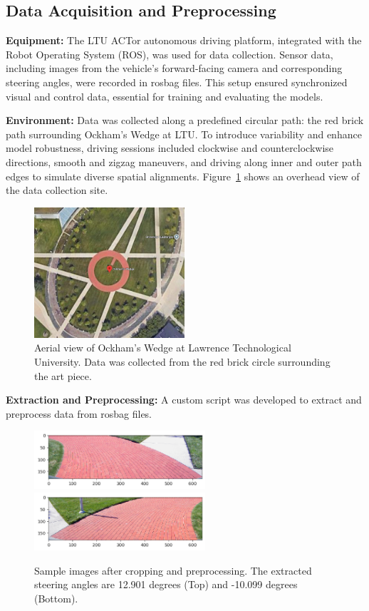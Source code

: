 \documentclass[conference]{IEEEtran}
\begin{document}
\subsection{Data Acquisition and Preprocessing}

\textbf{Equipment:} The LTU ACTor autonomous driving platform, integrated with the Robot Operating System (ROS), was used for data collection. Sensor data, including images from the vehicle's forward-facing camera and corresponding steering angles, were recorded in rosbag files. This setup ensured synchronized visual and control data, essential for training and evaluating the models.

\textbf{Environment:} Data was collected along a predefined circular path: the red brick path surrounding Ockham's Wedge at LTU. To introduce variability and enhance model robustness, driving sessions included clockwise and counterclockwise directions, smooth and zigzag maneuvers, and driving along inner and outer path edges to simulate diverse spatial alignments.  Figure~\ref{fig:ockham} shows an overhead view of the data collection site.

\begin{figure}[ht]
    \centering
    \includegraphics[width=2.2in]{assets/circle-maps.png}
    \caption{ Aerial view of Ockham's Wedge at Lawrence Technological University. Data was collected from the red brick circle surrounding the art piece. }
    \label{fig:ockham}
\end{figure}

\textbf{Extraction and Preprocessing:} A custom script was developed to extract and preprocess data from rosbag files.

\begin{figure}[ht]
    \centering
    \includegraphics[width=2.5in]{assets/leftturn.png}
    \includegraphics[width=2.5in]{assets/rightturn.png}
    \caption{Sample images after cropping and preprocessing. The extracted steering angles are 12.901 degrees (Top) and -10.099 degrees (Bottom).}
    \label{fig:preprocessed_images}
\end{figure}
\end{document}
